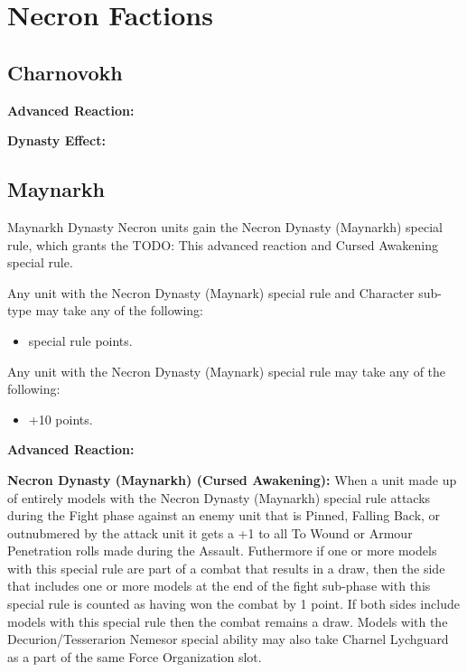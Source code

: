 \section{Necron Factions}

\subsection{Charnovokh}

\textbf{Advanced Reaction:}

\textbf{Dynasty Effect:}


\subsection{Maynarkh}

Maynarkh Dynasty Necron units gain the Necron Dynasty (Maynarkh) special rule, which grants the TODO: This advanced reaction and Cursed Awakening special rule. 

Any unit with the Necron Dynasty (Maynark) special rule and Character sub-type may take any of the following:
\begin{itemize}
	\item {} special rule  points.
\end{itemize}

Any unit with the Necron Dynasty (Maynark) special rule may take any of the following:
\begin{itemize}
	\item {} \dotfill +10 points.
\end{itemize}

\textbf{Advanced Reaction:}

\textbf{Necron Dynasty (Maynarkh) (Cursed Awakening):} When a unit made up of entirely models with the Necron Dynasty (Maynarkh) special rule attacks during the Fight phase against an enemy unit that is Pinned, Falling Back, or outnubmered by the attack unit it gets a +1 to all To Wound or Armour Penetration rolls made during the Assault. Futhermore if one or more models with this special rule are part of a combat that results in a draw, then the side that includes one or more models at the end of the fight sub-phase with this special rule is counted as having won the combat by 1 point. If both sides include models with this special rule then the combat remains a draw. Models with the Decurion/Tesserarion Nemesor special ability may also take Charnel Lychguard as a part of the same Force Organization slot.


